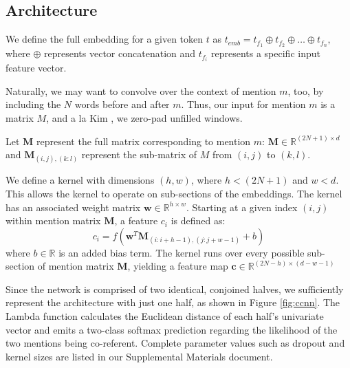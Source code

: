 \documentclass[11pt,a4paper]{article}
\begin{document}
\subsection{Architecture}
We define the full embedding for a given token $t$ as $t_{emb} = t_{f_{1}} \oplus t_{f_{2}} \oplus \ldots \oplus t_{f_{n}},$ where $\oplus$ represents vector concatenation and $t_{f_{i}}$ represents a specific input feature vector.

Naturally, we may want to convolve over the context of mention $m$, too, by including the $N$ words before and after $m$.  Thus, our input for mention $m$ is a matrix $M$, and a la Kim , we zero-pad unfilled windows.

\vspace{3mm}

Let $\textbf{M}$ represent the full matrix corresponding to mention $m$: $\textbf{M} \in \mathbb{R}^{(2N+1) \times d}$ and $\textbf{M}_{(i,j),(k:l)}$ represent the sub-matrix of $M$ from $(i,j)$ to $(k,l)$.

\vspace{3mm}

We define a kernel with dimensions $(h,w)$, where $h < (2N+1)$ and $w < d$.  This allows the kernel to operate on sub-sections of the embeddings.  The kernel has an associated weight matrix $\textbf{w} \in \mathbb{R}^{h \times w}$.  Starting at a given index $(i,j)$ within mention matrix $\textbf{M}$, a feature $c_{i}$ is defined as:
\begin{equation}
c_{i} = f(\textbf{w}^{T}\textbf{M}_{(i:i+h-1),(j:j+w-1)} + b)
\end{equation}
where $b \in \mathbb{R}$ is an added bias term.  The kernel runs over every possible sub-section of mention matrix $\textbf{M}$, yielding a feature map $\textbf{c} \in \mathbb{R}^{(2N-h) \times (d-w-1)}$

\vspace{3mm}

Since the network is comprised of two identical, conjoined halves, we sufficiently represent the architecture with just one half, as shown in Figure \ref{fig:ccnn}.  The Lambda function calculates the Euclidean distance of each half's univariate vector and emits a two-class softmax prediction regarding the likelihood of the two mentions being co-referent.  Complete parameter values such as dropout and kernel sizes are listed in our Supplemental Materials document.
\end{document}
